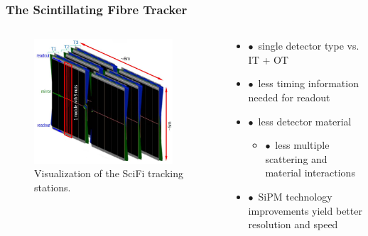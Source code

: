 \documentclass[aspectratio=1610, 12pt]{beamer}
\begin{document}
\begin{frame}\frametitle{The Scintillating Fibre Tracker}
  \begin{columns}
    \begin{column}[c]{0.48\textwidth}
      \begin{figure}
        \includegraphics[width=0.9\textwidth]{logos/scifi.png}
        \caption{Visualization of the SciFi tracking stations.}
      \end{figure}
    \end{column}
    \begin{column}{0.48\textwidth}
      \begin{itemize}
        \item $\bullet$\, single detector type vs. IT + OT
        \item $\bullet$\, less timing information needed for readout
        \item $\bullet$\, less detector material
        \begin{itemize}
          \item $\bullet$\, less multiple scattering and material interactions
        \end{itemize}
        \item $\bullet$\, SiPM technology improvements yield better resolution and speed
      \end{itemize}
    \end{column}
  \end{columns}
\end{frame}
\end{document}
